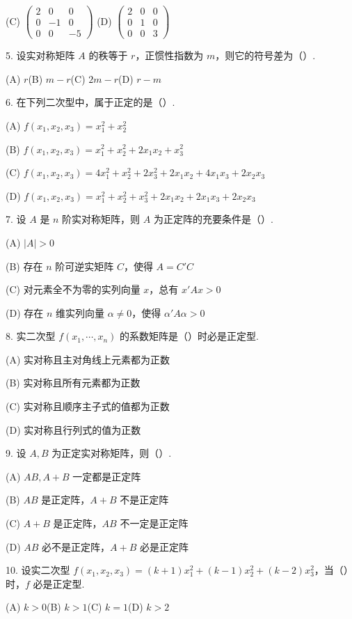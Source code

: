 \documentclass[UTF8,12pt,a4paper,fontset=fandol]{ctexart}
\begin{document}
(C) $\left(\begin{array}{ccc}2&0&0\\ 0&-1&0\\ 0&0&-5\end{array}\right)$
\qquad
(D) $\left(\begin{array}{ccc}2&0&0\\ 0&1&0\\ 0&0&3\end{array}\right)$

5. 设实对称矩阵 $A$ 的秩等于 $r$，正惯性指数为 $m$，则它的符号差为（\quad ）.

(A) $r$\qquad (B) $m-r$\qquad (C) $2m-r$\qquad (D) $r-m$

6. 在下列二次型中，属于正定的是（\quad ）.

(A) $f(x_1,x_2,x_3)=x_1^2+x_2^2$

(B) $f(x_1,x_2,x_3)=x_1^2+x_2^2+2x_1x_2+x_3^2$

(C) $f(x_1,x_2,x_3)=4x_1^2+x_2^2+2x_3^2+2x_1x_2+4x_1x_3+2x_2x_3$

(D) $f(x_1,x_2,x_3)=x_1^2+x_2^2+x_3^2+2x_1x_2+2x_1x_3+2x_2x_3$

7. 设 $A$ 是 $n$ 阶实对称矩阵，则 $A$ 为正定阵的充要条件是（\quad ）.

(A) $|A|>0$

(B) 存在 $n$ 阶可逆实矩阵 $C$，使得 $A=C'C$

(C) 对元素全不为零的实列向量 $x$，总有 $x'Ax>0$

(D) 存在 $n$ 维实列向量 $\alpha\ne 0$，使得 $\alpha'A\alpha>0$

8. 实二次型 $f(x_1,\cdots,x_n)$ 的系数矩阵是（\quad ）时必是正定型.

(A) 实对称且主对角线上元素都为正数

(B) 实对称且所有元素都为正数

(C) 实对称且顺序主子式的值都为正数

(D) 实对称且行列式的值为正数

9. 设 $A,B$ 为正定实对称矩阵，则（\quad ）.

(A) $AB,A+B$ 一定都是正定阵

(B) $AB$ 是正定阵，$A+B$ 不是正定阵

(C) $A+B$ 是正定阵，$AB$ 不一定是正定阵

(D) $AB$ 必不是正定阵，$A+B$ 必是正定阵

10. 设实二次型 $f(x_1,x_2,x_3)=(k+1)x_1^2+(k-1)x_2^2+(k-2)x_3^2$，当（\quad ）时，$f$ 必是正定型.

(A) $k>0$\qquad (B) $k>1$\qquad (C) $k=1$\qquad (D) $k>2$
\end{document}

